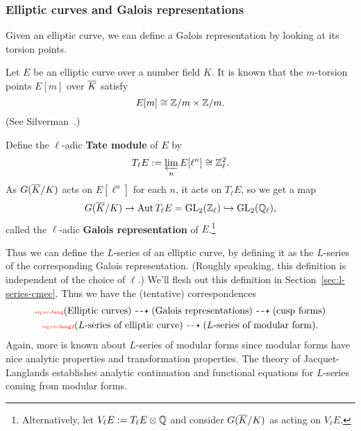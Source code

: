 \subsubsection{Elliptic curves and Galois representations}
Given an elliptic curve, we can define a Galois representation by looking at its torsion points.
\begin{df}
Let $E$ be an elliptic curve over a number field $K$. %
It is known that the $m$-torsion points $E[m]$ over $\overline{K}$ satisfy
\[
E[m]\cong \mathbb{Z}/m\times \mathbb{Z}/m.
\]
(See Silverman~\cite[III.6.4]{Si86}.)

Define the $\ell$-adic \textbf{Tate module} of $E$ by
\[
T_{\ell}E:=\varprojlim_n E[\ell^n]\cong\mathbb{Z}_{\ell}^2.
\]
As $G(\overline{K}/K)$ acts on $E[\ell^n]$ for each $n$, it acts on $T_{\ell}E$, so we get a map
\[
G(\overline{K}/K)\to \operatorname{Aut} T_{\ell}E=\operatorname{GL}_2(\mathbb{Z}_{\ell})\hookrightarrow \operatorname{GL}_2(\mathbb{Q}_{\ell}),
\]
called the $\ell$-adic \textbf{Galois representation} of $E$.\footnote{Alternatively, let $V_{\ell}E:=T_{\ell}E\otimes \mathbb{Q}$ and consider $G(\overline{K}/K)$ as acting on $V_{\ell}E$.}
\end{df}
Thus we can define the $L$-series of an elliptic curve, by defining it as the $L$-series of the corresponding Galois representation. (Roughly speaking, this definition is independent of the choice of $\ell$.) We'll flesh out this definition in Section~\ref{sec:l-series-cmec}. Thus we have the (tentative) correspondences
\begin{gather}\llabel{eq:ec-lang}
\text{(Elliptic curves)}\dashrightarrow \text{(Galois representations)}
\dashrightarrow \text{(cusp forms)}\\
\llabel{eq:ec-lang2}
(L\text{-series of elliptic curve})\dashrightarrow(L\text{-series of modular form}).
\end{gather}
Again, more is known about $L$-series of modular forms since modular forms have nice analytic properties and transformation properties. The theory of Jacquet-Langlands establishes analytic continuation and functional equations for $L$-series coming from modular forms. 

